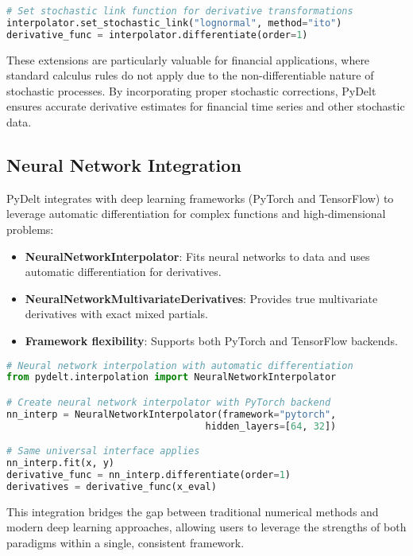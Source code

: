 \documentclass[11pt,a4paper]{article}
\begin{document}
\begin{lstlisting}[language=Python, caption=Stochastic calculus example]
# Set stochastic link function for derivative transformations
interpolator.set_stochastic_link("lognormal", method="ito")
derivative_func = interpolator.differentiate(order=1)
\end{lstlisting}

These extensions are particularly valuable for financial applications, where standard calculus rules do not apply due to the non-differentiable nature of stochastic processes. By incorporating proper stochastic corrections, PyDelt ensures accurate derivative estimates for financial time series and other stochastic data.

\subsection{Neural Network Integration}

PyDelt integrates with deep learning frameworks (PyTorch and TensorFlow) to leverage automatic differentiation for complex functions and high-dimensional problems:

\begin{itemize}
    \item \textbf{NeuralNetworkInterpolator}: Fits neural networks to data and uses automatic differentiation for derivatives.
    \item \textbf{NeuralNetworkMultivariateDerivatives}: Provides true multivariate derivatives with exact mixed partials.
    \item \textbf{Framework flexibility}: Supports both PyTorch and TensorFlow backends.
\end{itemize}

\begin{lstlisting}[language=Python, caption=Neural network integration example]
# Neural network interpolation with automatic differentiation
from pydelt.interpolation import NeuralNetworkInterpolator

# Create neural network interpolator with PyTorch backend
nn_interp = NeuralNetworkInterpolator(framework="pytorch", 
                                   hidden_layers=[64, 32])

# Same universal interface applies
nn_interp.fit(x, y)
derivative_func = nn_interp.differentiate(order=1)
derivatives = derivative_func(x_eval)
\end{lstlisting}

This integration bridges the gap between traditional numerical methods and modern deep learning approaches, allowing users to leverage the strengths of both paradigms within a single, consistent framework.
\end{document}
